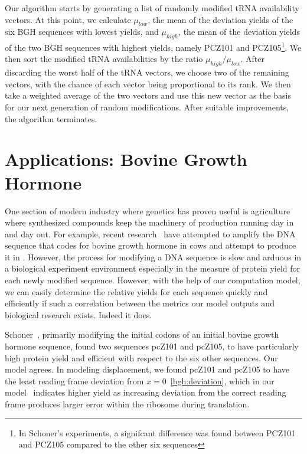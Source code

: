 \documentclass[12pt, draft]{article}
\numberwithin{equation}{section}
\begin{document}
Our algorithm starts by generating a list of randomly modified tRNA availability vectors.  At this point, we calculate $\mu_{low}$, the mean of the deviation yields of the six BGH sequences with lowest yields, and $\mu_{high}$, the mean of the deviation yields of the two BGH sequences with highest yields, namely PCZ101 and PCZ105\footnote{In Schoner's experiments, a signifcant difference was found between PCZ101 and PCZ105 compared to the other six sequences}.  We then sort the modified tRNA availabilities by the ratio $\mu_{high}/\mu_{low}$.  After discarding the worst half of the tRNA vectors, we choose two of the remaining vectors, with the chance of each vector being proportional to its rank.  We then take a weighted average of the two vectors and use this new vector as the basis for our next generation of random modifications.  After suitable improvements, the algorithm terminates.

\section{Applications: Bovine Growth Hormone}
One section of modern industry where genetics has proven useful is
agriculture where synthesized compounds keep the machinery of
production running day in and day out. For example, recent
research~\cite{schoner:bgh} have attempted to amplify the DNA sequence
that codes for bovine growth hormone in cows and attempt to produce it
in \ecoli. However, the process for modifying a DNA sequence is slow
and arduous in a biological experiment environment especially in the
measure of protein yield for each newly modified sequence. However,
with the help of our computation model, we can easily determine the
relative yields for each sequence quickly and efficiently if such a
correlation between the metrics our model outputs and biological
research exists. Indeed it does.

Schoner~\cite{schoner:bgh}, primarily modifying the initial codons of an initial
bovine growth hormone sequence, found two sequences pcZ101 and pcZ105,
to have particularly high protein yield and efficient with respect to
the six other sequences. Our model agrees. In modeling displacement,
we found pcZ101 and pcZ105 to have the least reading frame deviation
from $x = 0$~\ref{bgh:deviation}, which in our model~\cite{lalit:mechanics} indicates
higher yield as increasing deviation from the correct reading frame
produces larger error within the ribosome during translation.
\end{document}
